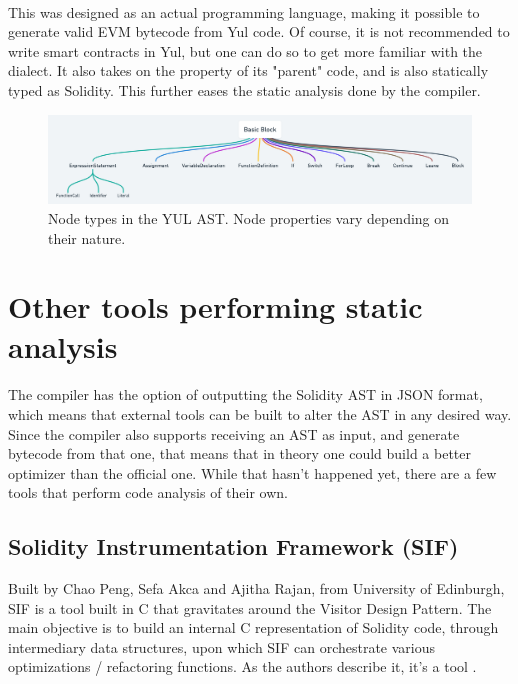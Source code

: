 \paragraph*{}
This was designed as an actual programming language, making it possible to generate valid EVM bytecode from Yul code. Of course, it is not recommended to write smart contracts in Yul, but one can do so to get more familiar with the dialect. It also takes on the property of its "parent" code, and is also statically typed as Solidity. This further eases the static analysis done by the compiler.

\begin{figure}
    \centering
    \includegraphics[width=\textwidth]{images/yul_ast_node_types.png}
    \caption{Node types in the YUL AST. Node properties vary depending on their nature.}
    \label{fig:yul-ast-node-types}
\end{figure}


\section{Other tools performing static analysis}
\paragraph*{}
The compiler has the option of outputting the Solidity AST in JSON format, which means that external tools can be built to alter the AST in any desired way. Since the compiler also supports receiving an AST as input, and generate bytecode from that one, that means that in theory one could build a better optimizer than the official one. While that hasn't happened yet, there are a few tools that perform code analysis of their own.

\subsection{Solidity Instrumentation Framework (SIF)}

Built by Chao Peng, Sefa Akca and Ajitha Rajan, from University of Edinburgh, SIF is a tool built in C that gravitates around the Visitor Design Pattern. The main objective is to build an internal C representation of Solidity code, through intermediary data structures, upon which SIF can orchestrate various optimizations / refactoring functions. As the authors describe it, it's a tool \cite[to easily and effectively understand, manipulate and analyse Solidity code]{sif}.

